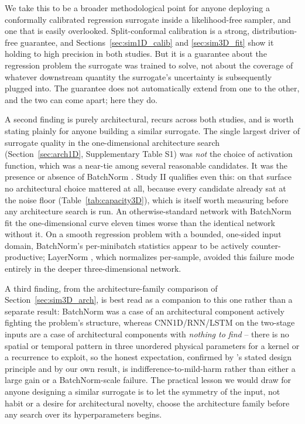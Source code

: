 \documentclass[sn-basic,iicol,pdflatex]{sn-jnl}
\begin{document}
We take this to be a broader methodological point for anyone deploying a
conformally calibrated regression surrogate inside a likelihood-free sampler,
and one that is easily overlooked. Split-conformal calibration
\citep{lei2018} is a strong, distribution-free guarantee, and
Sections~\ref{sec:sim1D_calib} and \ref{sec:sim3D_fit} show it holding to high
precision in both studies. But it is a guarantee about the regression problem
the surrogate was trained to solve, not about the coverage of whatever
downstream quantity the surrogate's uncertainty is subsequently plugged into.
The guarantee does not automatically extend from one to the other, and the two
can come apart; here they do.

A second finding is purely architectural, recurs across both studies, and is
worth stating plainly for anyone building a similar surrogate. The single
largest driver of surrogate quality in the one-dimensional architecture search
(Section~\ref{sec:arch1D}, Supplementary Table S1) was \emph{not} the choice of activation function, which
was a near-tie among several reasonable candidates. It was the presence or
absence of BatchNorm \citep{ioffe2015}. Study II qualifies even this: on that surface no
architectural choice mattered at all, because every candidate already sat at
the noise floor (Table~\ref{tab:capacity3D}), which is itself worth measuring
before any architecture search is run. An otherwise-standard network with BatchNorm
fit the one-dimensional curve eleven times worse than the identical network
without it. On a smooth regression problem with a bounded, one-sided input
domain, BatchNorm's per-minibatch statistics appear to be actively
counter-productive; LayerNorm \citep{ba2016}, which normalizes per-sample,
avoided this failure mode entirely in the deeper three-dimensional network.

A third finding, from the architecture-family comparison of
Section~\ref{sec:sim3D_arch}, is best read as a companion to this one rather
than a separate result: BatchNorm was a case of an architectural component
actively fighting the problem's structure, whereas CNN1D/RNN/LSTM on the
two-stage inputs are a case of architectural components with \emph{nothing to
find} -- there is no spatial or temporal pattern in three unordered physical
parameters for a kernel or a recurrence to exploit, so the honest expectation,
confirmed by \citet{radev2020}'s stated design principle and by our own
result, is indifference-to-mild-harm rather than either a large gain or a
BatchNorm-scale failure. The practical lesson we would draw for anyone
designing a similar surrogate is to let the symmetry of the input, not habit or
a desire for architectural novelty, choose the architecture family before any
search over its hyperparameters begins.
\end{document}
